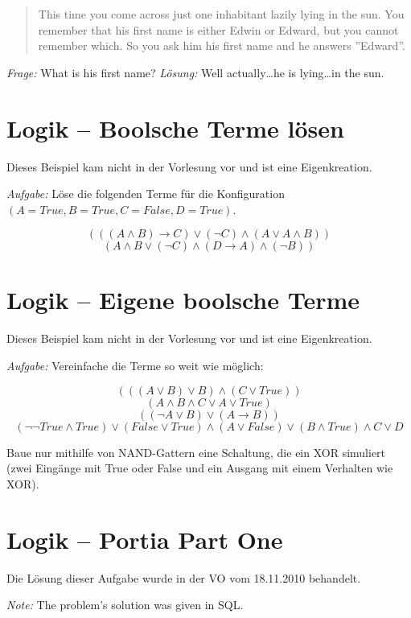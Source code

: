 \documentclass[11pt,a4paper]{article}
\newcommand{\ra}{\rightarrow}
\theoremstyle{area}
\begin{document}
\begin{quote}
  This time you come across just one inhabitant lazily lying in the sun.
  You remember that his first name is either Edwin or Edward, but you
  cannot remember which. So you ask him his first name and he answers
  ''Edward''.
\end{quote}

\emph{Frage:} What is his first name?
\emph{Lösung:} Well actually\dots he is lying\dots in the sun.

\section{Logik -- Boolsche Terme lösen}

Dieses Beispiel kam nicht in der Vorlesung vor und ist eine Eigenkreation.

\emph{Aufgabe:} Löse die folgenden Terme für die Konfiguration
    $(A=True, B=True, C=False, D=True)$.

\[
    (((A \land B) \ra C) \lor (\neg C) \land (A \lor A \land B))
\] \[
    (A \land B \lor (\neg C) \land (D \ra A) \land (\neg B))
\]

\section{Logik -- Eigene boolsche Terme}

Dieses Beispiel kam nicht in der Vorlesung vor und ist eine Eigenkreation.

\emph{Aufgabe:} Vereinfache die Terme so weit wie möglich:

\[
    (((A \lor B) \lor B) \land (C \lor True))
\] \[
    (A \land B \land C \lor A \lor True)
\] \[
    ((\neg A \lor B) \lor (A \ra B))
\] \[
    (\neg \neg True \land True) \lor (False \lor True) \land
        (A \lor False) \lor (B \land True) \land C \lor D
\]

Baue nur mithilfe von NAND-Gattern eine Schaltung, die ein XOR simuliert
(zwei Eingänge mit True oder False und ein Ausgang mit einem Verhalten wie
XOR).

\section{Logik -- Portia Part One}

Die Lösung dieser Aufgabe wurde in der VO vom 18.11.2010 behandelt.

\emph{Note:} The problem's solution was given in SQL.
\end{document}
